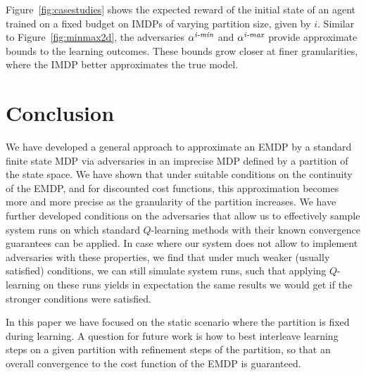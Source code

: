 \documentclass{llncs}
\begin{document}
Figure~\ref{fig:casestudies} shows the expected reward of the initial state of an agent trained on a fixed budget
on IMDPs of varying partition size, given by $i$.
Similar to Figure~\ref{fig:minmax2d}, the adversaries $\alpha^{\emph{i-min}}$ and $\alpha^{\emph{i-max}}$ provide
approximate bounds to the learning outcomes.
These bounds grow closer at finer granularities, where the IMDP better approximates the true model.



\section{Conclusion}

We have developed a general approach to approximate an EMDP  by a standard finite
state MDP via adversaries in an imprecise MDP defined by a partition of the state space.
We have shown that under suitable conditions on the
continuity of the EMDP, and for discounted cost functions, this approximation becomes
more and more precise as the granularity of the partition increases. We have further developed
conditions on the adversaries that allow us to effectively sample system runs on which standard
$Q$-learning methods with their known convergence guarantees can be applied. In case where
our system does not allow to implement adversaries with these properties, we find that under
much weaker (usually satisfied) conditions, we can still simulate system runs, such that applying
$Q$-learning on these runs yields in expectation the same results we would get if the stronger
conditions were satisfied.

In this paper we have focused on the static scenario where the partition is fixed during learning.
A question for future work is how to best interleave learning steps on a given partition with
refinement steps of the partition, so that an overall convergence to the cost function of the
EMDP is guaranteed.






%
\end{document}

